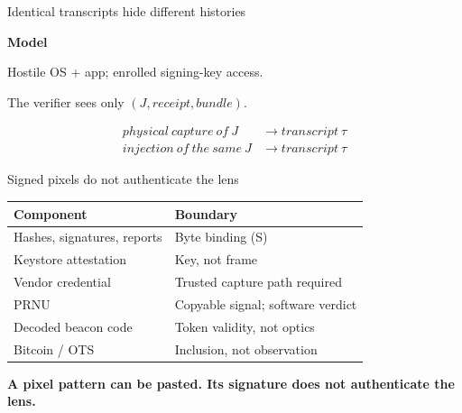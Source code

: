 \begingroup
{}

\begin{frame}[noframenumbering]{Identical transcripts hide different histories}
\begin{pitchcard}
\textbf{Model}\par
Hostile OS + app; enrolled signing-key access.\par
The verifier sees only $(J,\mathit{receipt},\mathit{bundle})$.
\end{pitchcard}
\vspace{0.3cm}
\begin{align*}
\mathit{physical\ capture\ of}\ J&\longrightarrow\mathit{transcript}\ \tau\\
\mathit{injection\ of\ the\ same}\ J&\longrightarrow\mathit{transcript}\ \tau
\end{align*}
\vspace{0.2cm}

\vfill
{}
\end{frame}

\begin{frame}[noframenumbering]{Signed pixels do not authenticate the lens}
\renewcommand{\arraystretch}{1.5}
\begin{tabular}{@{}>{\raggedright\arraybackslash}p{5.3cm}>{\raggedright\arraybackslash}p{7.5cm}@{}}
\textbf{Component} & \textbf{Boundary}\\\hline
Hashes, signatures, reports & Byte binding (S)\\
Keystore attestation & Key, not frame\\
Vendor credential & Trusted capture path required\\
PRNU & Copyable signal; software verdict\\
Decoded beacon code & Token validity, not optics\\
Bitcoin / OTS & Inclusion, not observation\\
\end{tabular}\par
\vfill
\textbf{A pixel pattern can be pasted. Its signature does not authenticate the lens.}\par\vspace{0.15cm}
\end{frame}

